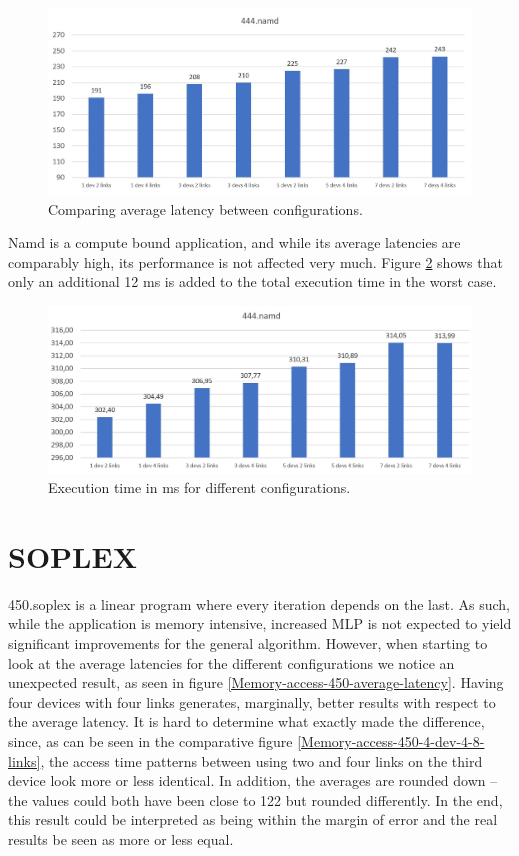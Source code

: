 \begin{figure}[!ht]
    \centering
    \includegraphics[width=1.0\linewidth]{figure/444_averages.jpg}
    \caption{Comparing average latency between configurations.}
    \label{Memory-access-444-average-latency}
\end{figure}

Namd is a compute bound application, and while its average latencies are comparably high, its performance is not affected very much. Figure \ref{Memory-access-444-exectime} shows that only an additional 12 ms is added to the total execution time in the worst case. 

\begin{figure}[!ht]
    \centering
    \includegraphics[width=1.0\linewidth]{figure/444-exectime.jpg}
    \caption{Execution time in ms for different configurations.}
    \label{Memory-access-444-exectime}
\end{figure}

\section{SOPLEX}
450.soplex is a linear program where every iteration depends on the last. As such, while the application is memory intensive, increased MLP is not expected to yield significant improvements for the general algorithm. However, when starting to look at the average latencies for the different configurations we notice an unexpected result, as seen in figure \ref{Memory-access-450-average-latency}. Having four devices with four links generates, marginally, better results with respect to the average latency. It is hard to determine what exactly made the difference, since, as can be seen in the comparative figure \ref{Memory-access-450-4-dev-4-8-links}, the access time patterns between using two and four links on the third device look more or less identical. In addition, the averages are rounded down -- the values could both have been close to 122 but rounded differently. In the end, this result could be interpreted as being within the margin of error and the real results be seen as more or less equal.
\bigskip

